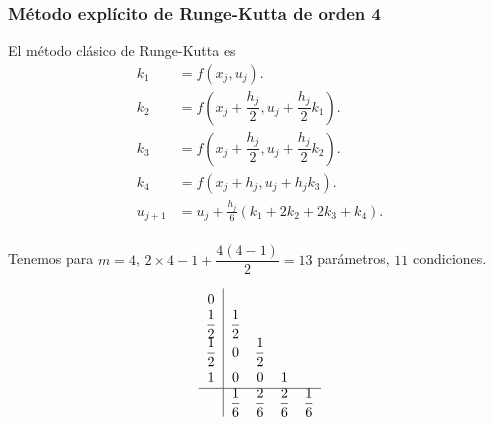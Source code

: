 \begin{frame}
	\frametitle{Método explícito de Runge-Kutta de orden 4}
	El método clásico de Runge-Kutta es
	\begin{align*}
		k_{1}   & = f\left(x_{j},u_{j}\right).                                        \\
		k_{2}   & = f\left(x_{j}+\dfrac{h_{j}}{2},u_{j}+\dfrac{h_{j}}{2}k_{1}\right). \\
		k_{3}   & = f\left(x_{j}+\dfrac{h_{j}}{2},u_{j}+\dfrac{h_{j}}{2}k_{2}\right). \\
		k_{4}   & = f\left(x_{j}+h_{j},u_{j}+h_{j}k_{3}\right).                       \\
		u_{j+1} & = u_{j}+\frac{h_{j}}{6}\left(k_{1}+2k_{2}+2k_{3}+k_{4}\right).      \\
	\end{align*}

	Tenemos para $m=4$, $2\times 4-1+\dfrac{4\left(4-1\right)}{2}=13$
	parámetros, $11$ condiciones.

	\begin{equation*}
		\renewcommand\arraystretch{1.3}
		\begin{array}
			{c|cccc}
			0                                                                        \\
			\dfrac{1}{2} & \dfrac{1}{2}                                              \\
			\dfrac{1}{2} & 0            & \dfrac{1}{2}                               \\
			1            & 0            & 0            & 1                           \\
			\hline
			             & \dfrac{1}{6} & \dfrac{2}{6} & \dfrac{2}{6} & \dfrac{1}{6}
		\end{array}
	\end{equation*}
\end{frame}